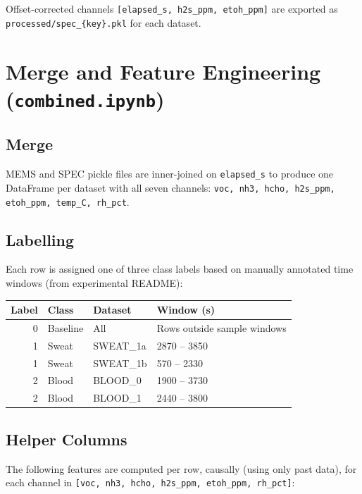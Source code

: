 \documentclass[11pt,a4paper]{article}
\begin{document}
Offset-corrected channels \texttt{[elapsed\_s, h2s\_ppm, etoh\_ppm]} are
exported as \texttt{processed/spec\_\{key\}.pkl} for each dataset.

\section{Merge and Feature Engineering (\texttt{combined.ipynb})}

\subsection{Merge}

MEMS and SPEC pickle files are inner-joined on \texttt{elapsed\_s} to produce
one DataFrame per dataset with all seven channels:
\texttt{voc, nh3, hcho, h2s\_ppm, etoh\_ppm, temp\_C, rh\_pct}.

\subsection{Labelling}

Each row is assigned one of three class labels based on manually annotated
time windows (from experimental README):

\begin{center}
\begin{tabular}{rlll}
\toprule
Label & Class & Dataset & Window (s) \\
\midrule
0 & Baseline & All & Rows outside sample windows \\
1 & Sweat    & SWEAT\_1a & 2870 -- 3850 \\
1 & Sweat    & SWEAT\_1b &  570 -- 2330 \\
2 & Blood    & BLOOD\_0  & 1900 -- 3730 \\
2 & Blood    & BLOOD\_1  & 2440 -- 3800 \\
\bottomrule
\end{tabular}
\end{center}

\subsection{Helper Columns}

The following features are computed per row, causally (using only past data),
for each channel in \texttt{[voc, nh3, hcho, h2s\_ppm, etoh\_ppm, rh\_pct]}:
\end{document}
